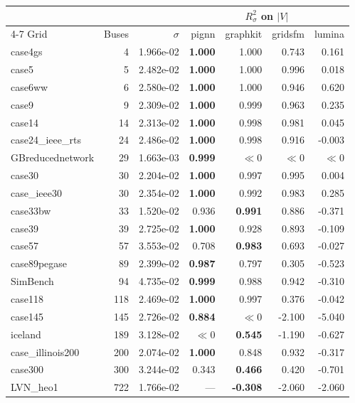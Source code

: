 \documentclass[10pt]{article}
\begin{document}
\begin{table}[H]
\centering\small
\begin{tabular}{lrr rrrr}
\toprule
 & & & \multicolumn{4}{c}{$R^2_{\sigma}$ on $|V|$} \\
\cmidrule(lr){4-7}
Grid & Buses & $\sigma$ & pignn & graphkit & gridsfm & lumina \\
\midrule
case4gs & 4 & 1.966e-02 & \textbf{1.000} & 1.000 & 0.743 & 0.161 \\
case5 & 5 & 2.482e-02 & \textbf{1.000} & 1.000 & 0.996 & 0.018 \\
case6ww & 6 & 2.580e-02 & \textbf{1.000} & 1.000 & 0.946 & 0.620 \\
case9 & 9 & 2.309e-02 & \textbf{1.000} & 0.999 & 0.963 & 0.235 \\
case14 & 14 & 2.313e-02 & \textbf{1.000} & 0.998 & 0.981 & 0.045 \\
case24\_ieee\_rts & 24 & 2.486e-02 & \textbf{1.000} & 0.998 & 0.916 & -0.003 \\
GBreducednetwork & 29 & 1.663e-03 & \textbf{0.999} & $\ll$0 & $\ll$0 & $\ll$0 \\
case30 & 30 & 2.204e-02 & \textbf{1.000} & 0.997 & 0.995 & 0.004 \\
case\_ieee30 & 30 & 2.354e-02 & \textbf{1.000} & 0.992 & 0.983 & 0.285 \\
case33bw & 33 & 1.520e-02 & 0.936 & \textbf{0.991} & 0.886 & -0.371 \\
case39 & 39 & 2.725e-02 & \textbf{1.000} & 0.928 & 0.893 & -0.109 \\
case57 & 57 & 3.553e-02 & 0.708 & \textbf{0.983} & 0.693 & -0.027 \\
case89pegase & 89 & 2.399e-02 & \textbf{0.987} & 0.797 & 0.305 & -0.523 \\
SimBench & 94 & 4.735e-02 & \textbf{0.999} & 0.988 & 0.942 & -0.310 \\
case118 & 118 & 2.469e-02 & \textbf{1.000} & 0.997 & 0.376 & -0.042 \\
case145 & 145 & 2.726e-02 & \textbf{0.884} & $\ll$0 & -2.100 & -5.040 \\
iceland & 189 & 3.128e-02 & $\ll$0 & \textbf{0.545} & -1.190 & -0.627 \\
case\_illinois200 & 200 & 2.074e-02 & \textbf{1.000} & 0.848 & 0.932 & -0.317 \\
case300 & 300 & 3.244e-02 & 0.343 & \textbf{0.466} & 0.420 & -0.701 \\
LVN\_heo1 & 722 & 1.766e-02 & --- & \textbf{-0.308} & -2.060 & -2.060 \\

\end{tabular}
\end{table}
\end{document}
